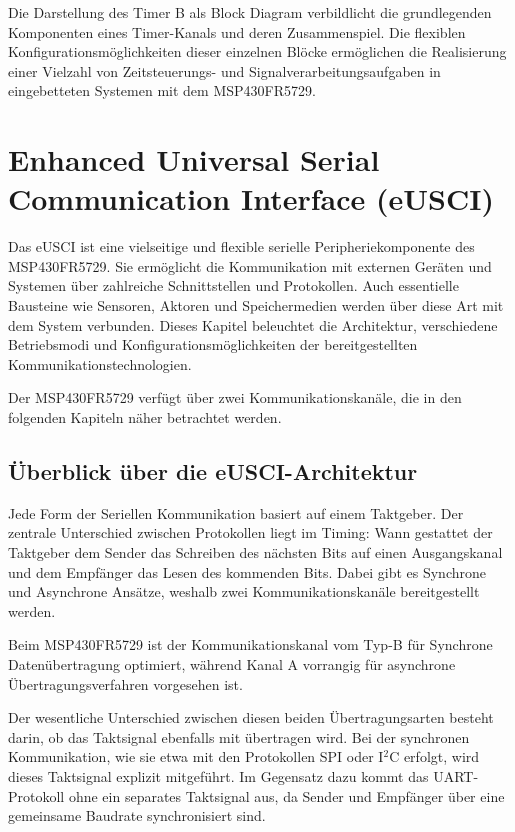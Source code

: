 Die Darstellung  des Timer B als Block Diagram verbildlicht die grundlegenden Komponenten eines Timer-Kanals und deren Zusammenspiel. Die flexiblen Konfigurationsm\"oglichkeiten dieser einzelnen Bl\"ocke erm\"oglichen die Realisierung einer Vielzahl von Zeitsteuerungs- und Signalverarbeitungsaufgaben in eingebetteten Systemen mit dem MSP430FR5729.

\newpage
\section{Enhanced Universal Serial Communication Interface (eUSCI)}
\label{sec:eUSCI}

Das eUSCI ist eine vielseitige und flexible serielle Peripheriekomponente des MSP430FR5729. Sie erm\"oglicht die Kommunikation mit externen Ger\"aten und Systemen \"uber zahlreiche Schnittstellen und Protokollen. Auch essentielle Bausteine wie Sensoren, Aktoren und Speichermedien werden \"uber diese Art mit dem System verbunden. Dieses Kapitel beleuchtet die Architektur, verschiedene Betriebsmodi und Konfigurationsm\"oglichkeiten der bereitgestellten Kommunikationstechnologien.

Der MSP430FR5729 verf\"ugt \"uber zwei Kommunikationskan\"ale, die in den folgenden Kapiteln n\"aher betrachtet werden. 

\subsection{\"Uberblick \"uber die eUSCI-Architektur}
\label{sec:eUSCI_Architektur}

Jede Form der Seriellen Kommunikation basiert auf einem Taktgeber. Der zentrale Unterschied zwischen Protokollen liegt im Timing: Wann gestattet der Taktgeber dem Sender das Schreiben des n\"achsten Bits auf einen Ausgangskanal und dem Empf\"anger das Lesen des kommenden Bits. Dabei gibt es Synchrone und Asynchrone Ans\"atze, weshalb zwei Kommunikationskan\"ale bereitgestellt werden. 

Beim MSP430FR5729 ist der Kommunikationskanal vom Typ-B f\"ur Synchrone Daten\"ubertragung optimiert, w\"ahrend Kanal A vorrangig f\"ur asynchrone \"Ubertragungsverfahren vorgesehen ist. 

Der wesentliche Unterschied zwischen diesen beiden \"Ubertragungsarten besteht darin, ob das Taktsignal ebenfalls mit \"ubertragen wird. Bei der synchronen Kommunikation, wie sie etwa mit den Protokollen SPI oder I$^{2}$C erfolgt, wird dieses Taktsignal explizit mitgef\"uhrt. Im Gegensatz dazu kommt das UART-Protokoll ohne ein separates Taktsignal aus, da Sender und Empf\"anger \"uber eine gemeinsame Baudrate synchronisiert sind. 

